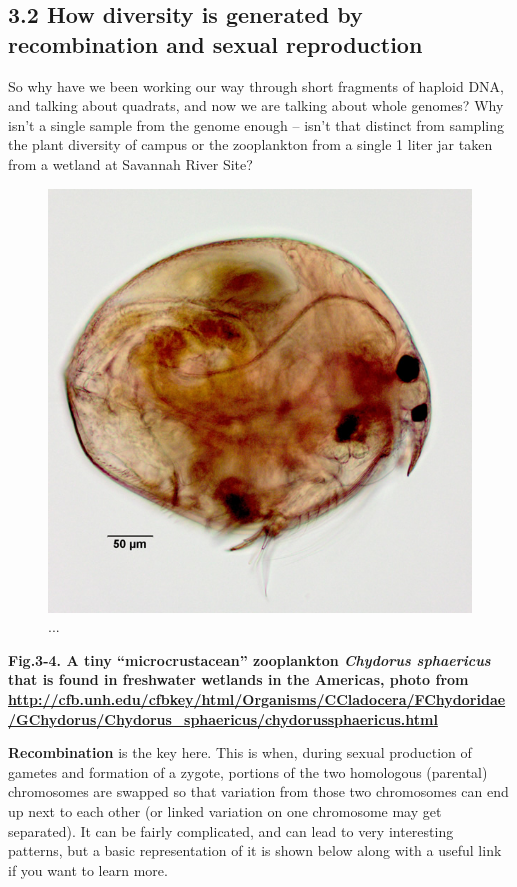 \documentclass[
]{article}
\begin{document}
\hypertarget{how-diversity-is-generated-by-recombination-and-sexual-reproduction}{%
\subsection{3.2 How diversity is generated by recombination and sexual
reproduction}\label{how-diversity-is-generated-by-recombination-and-sexual-reproduction}}

So why have we been working our way through short fragments of haploid
DNA, and talking about quadrats, and now we are talking about whole
genomes? Why isn't a single sample from the genome enough -- isn't that
distinct from sampling the plant diversity of campus or the zooplankton
from a single 1 liter jar taken from a wetland at Savannah River Site?

\begin{figure}

{\centering \includegraphics[width=0.5\linewidth]{MEImages/chydorus} 

}

\caption{...}\label{fig:unnamed-chunk-6}
\end{figure}

\textbf{Fig.3-4. A tiny ``microcrustacean'' zooplankton \emph{Chydorus
sphaericus} that is found in freshwater wetlands in the Americas, photo
from
\url{http://cfb.unh.edu/cfbkey/html/Organisms/CCladocera/FChydoridae/GChydorus/Chydorus_sphaericus/chydorussphaericus.html}
}

\textbf{Recombination} is the key here. This is when, during sexual
production of gametes and formation of a zygote, portions of the two
homologous (parental) chromosomes are swapped so that variation from
those two chromosomes can end up next to each other (or linked variation
on one chromosome may get separated). It can be fairly complicated, and
can lead to very interesting patterns, but a basic representation of it
is shown below along with a useful link if you want to learn more.
\end{document}
